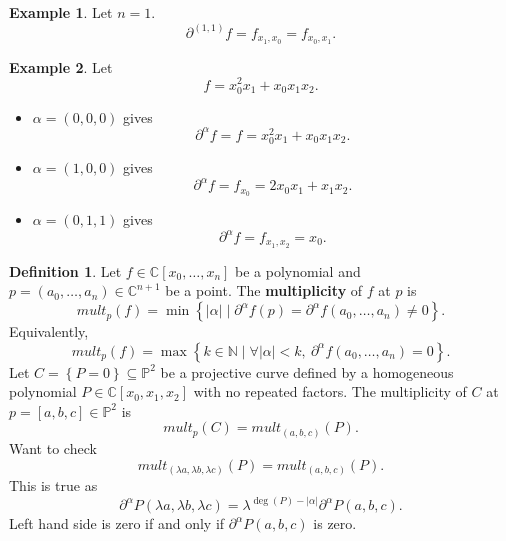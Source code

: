 \documentclass{article}
\newcommand{\N}{\mathbb{N}}
\newcommand{\C}{\mathbb{C}}
\renewcommand{\P}{\mathbb{P}}
\newcommand{\rb}[1]{\left( #1 \right)}
\renewcommand{\sb}[1]{\left[ #1 \right]}
\newcommand{\cb}[1]{\left\{ #1 \right\}}
\newcommand{\abs}[1]{\left\lvert #1 \right\rvert}
\theoremstyle{definition}\newtheorem{definition}{Definition}[section]
\theoremstyle{definition}\newtheorem{notation}[definition]{Notation}
\theoremstyle{definition}\newtheorem{remark}[definition]{Remark}
\theoremstyle{definition}\newtheorem{example1}[definition]{Example}
\theoremstyle{definition}\newtheorem{fact}{Fact}
\theoremstyle{definition}\newtheorem{exercise}{Exercise}
\theoremstyle{definition}\newtheorem*{example2}{Example}
\begin{document}
\begin{example2}
Let $ n = 1 $.
$$ \partial^{\rb{1, 1}} f = f_{x_1, x_0} = f_{x_0, x_1}. $$
\end{example2}

\begin{example2}
Let
$$ f = x_0^2x_1 + x_0x_1x_2. $$
\begin{itemize}
\item $ \alpha = \rb{0, 0, 0} $ gives
$$ \partial^\alpha f = f = x_0^2x_1 + x_0x_1x_2. $$
\item $ \alpha = \rb{1, 0, 0} $ gives
$$ \partial^\alpha f = f_{x_0} = 2x_0x_1 + x_1x_2. $$
\item $ \alpha = \rb{0, 1, 1} $ gives
$$ \partial^\alpha f = f_{x_1, x_2} = x_0. $$
\end{itemize}
\end{example2}

\begin{definition}
Let $ f \in \C\sb{x_0, \dots, x_n} $ be a polynomial and $ p = \rb{a_0, \dots, a_n} \in \C^{n + 1} $ be a point. The \textbf{multiplicity} of $ f $ at $ p $ is
$$ mult_p\rb{f} = \min\cb{\abs{\alpha} \mid \partial^\alpha f\rb{p} = \partial^\alpha f\rb{a_0, \dots, a_n} \ne 0}. $$
Equivalently,
$$ mult_p\rb{f} = \max\cb{k \in \N \mid \forall \abs{\alpha} < k, \ \partial^\alpha f\rb{a_0, \dots, a_n} = 0}. $$
Let $ C = \cb{P = 0} \subseteq \P^2 $ be a projective curve defined by a homogeneous polynomial $ P \in \C\sb{x_0, x_1, x_2} $ with no repeated factors. The multiplicity of $ C $ at $ p = \sb{a, b, c} \in \P^2 $ is
$$ mult_p\rb{C} = mult_{\rb{a, b, c}}\rb{P}. $$
Want to check
$$ mult_{\rb{\lambda a, \lambda b, \lambda c}}\rb{P} = mult_{\rb{a, b, c}}\rb{P}. $$
This is true as
$$ \partial^\alpha P\rb{\lambda a, \lambda b, \lambda c} = \lambda^{\deg\rb{P} - \abs{\alpha}}\partial^\alpha P\rb{a, b, c}. $$
Left hand side is zero if and only if $ \partial^\alpha P\rb{a, b, c} $ is zero.
\end{definition}

\end{document}
